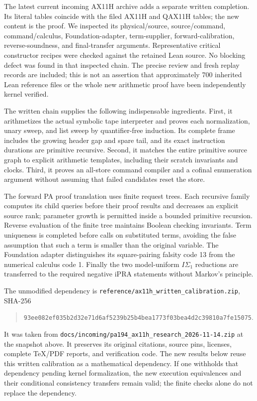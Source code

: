 \documentclass[11pt,letterpaper]{article}
\newcommand{\file}[1]{\texttt{\nolinkurl{#1}}}
\begin{document}
The latest current incoming AX11H archive adds a separate written
completion. Its literal tables coincide with the filed AX11H and QAX11H
tables; the new content is the proof. We inspected its physical/source,
source/command, command/calculus, Foundation-adapter, term-supplier,
forward-calibration, reverse-soundness, and final-transfer arguments.
Representative critical constructor recipes were checked against the
retained Lean source. No blocking defect was found in that inspected
chain. The precise review and fresh replay records are included; this is
not an assertion that approximately 700 inherited Lean reference files or
the whole new arithmetic proof have been independently kernel verified.

The written chain supplies the following indispensable ingredients.
First, it arithmetizes the actual symbolic tape interpreter and proves
each normalization, unary sweep, and list sweep by quantifier-free
induction. Its complete frame includes the growing header gap and spare
tail, and its exact instruction durations are primitive recursive.
Second, it matches the entire primitive source graph to explicit
arithmetic templates, including their scratch invariants and clocks.
Third, it proves an all-store command compiler and a cofinal enumeration
argument without assuming that failed candidates reset the store.

The forward PA proof translation uses finite request trees. Each recursive
family computes its child queries before their proof results and decreases
an explicit source rank; parameter growth is permitted inside a bounded
primitive recursion. Reverse evaluation of the finite tree maintains
Boolean checking invariants. Term uniqueness is completed before calls
on substituted terms, avoiding the false assumption that such a term is
smaller than the original variable. The Foundation adapter distinguishes
its square-pairing falsity code 13 from the numerical calculus code 1.
Finally the two model-uniform $I\Sigma_1$ reductions are transferred to
the required negative iPRA statements without Markov's principle.

The unmodified dependency is
\file{reference/ax11h_written_calibration.zip}, SHA-256
\begin{quote}\small\nolinkurl{93ee082ef035b2d32e71d6af5239b25b4bea1773f03bea4d2c39810a7fe15075}.\end{quote}
It was taken from \file{docs/incoming/pa194_ax11h_research_2026-11-14.zip}
at the snapshot above. It preserves its original citations, source pins,
licenses, complete TeX/PDF reports, and verification code. The new results
below reuse this written calibration as a mathematical dependency. If one
withholds that dependency pending kernel formalization, the new execution
equivalences and their conditional consistency transfers remain valid;
the finite checks alone do not replace the dependency.
\end{document}
